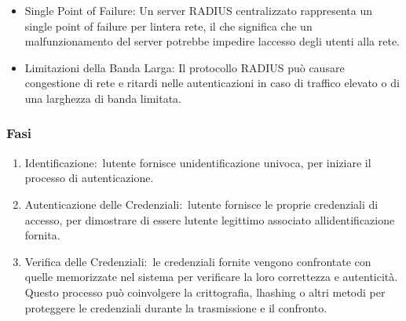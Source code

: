 \documentclass[
]{article}
\providecommand{\tightlist}{%
  \setlength{\itemsep}{0pt}\setlength{\parskip}{0pt}}
\begin{document}
{}

\begin{itemize}
\tightlist
\item
  {Single Point of Failure}{: Un server RADIUS centralizzato rappresenta
  un single point of failure per l\textquotesingle intera rete, il che
  significa che un malfunzionamento del server potrebbe impedire
  l\textquotesingle accesso degli utenti alla rete. }
\end{itemize}

{}

\begin{itemize}
\tightlist
\item
  {Limitazioni della Banda Larga}{: Il protocollo RADIUS può causare
  congestione di rete e ritardi nelle autenticazioni in caso di traffico
  elevato o di una larghezza di banda limitata.}
\end{itemize}

\subsubsection{\texorpdfstring{{Fasi}}{Fasi}}\label{h.2cbo7axyrtx}

\begin{enumerate}
\tightlist
\item
  {Identificazione:}{~l\textquotesingle utente fornisce
  un\textquotesingle identificazione univoca, per iniziare il processo
  di autenticazione. }
\end{enumerate}

{}

\begin{enumerate}
\setcounter{enumi}{1}
\tightlist
\item
  {Autenticazione delle Credenziali:}{~l\textquotesingle utente fornisce
  le proprie credenziali di accesso, per dimostrare di essere
  l\textquotesingle utente legittimo associato
  all\textquotesingle identificazione fornita. }
\end{enumerate}

{}

\begin{enumerate}
\setcounter{enumi}{2}
\tightlist
\item
  {Verifica delle Credenziali:}{~le credenziali fornite vengono
  confrontate con quelle memorizzate nel sistema per verificare la loro
  correttezza e autenticità. Questo processo può coinvolgere la
  crittografia, l\textquotesingle hashing o altri metodi per proteggere
  le credenziali durante la trasmissione e il confronto.}
\end{enumerate}
\end{document}
